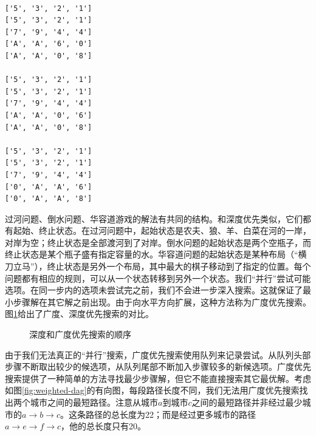 \documentclass[b5paper]{ctexart}
\begin{document}
\begin{verbatim}

['5', '3', '2', '1']
['5', '3', '2', '1']
['7', '9', '4', '4']
['A', 'A', '6', '0']
['A', 'A', '0', '8']

['5', '3', '2', '1']
['5', '3', '2', '1']
['7', '9', '4', '4']
['A', 'A', '0', '6']
['A', 'A', '0', '8']

['5', '3', '2', '1']
['5', '3', '2', '1']
['7', '9', '4', '4']
['0', 'A', 'A', '6']
['0', 'A', 'A', '8']

\end{verbatim}

 
过河问题、倒水问题、华容道游戏的解法有共同的结构。和深度优先类似，它们都有起始、终止状态。在过河问题中，起始状态是农夫、狼、羊、白菜在河的一岸，对岸为空；终止状态是全部渡河到了对岸。倒水问题的起始状态是两个空瓶子，而终止状态是某个瓶子盛有指定容量的水。华容道问题的起始状态是某种布局（“横刀立马”），终止状态是另外一个布局，其中最大的棋子移动到了指定的位置。每个问题都有相应的规则，可以从一个状态转移到另外一个状态。我们“并行”尝试可能选项。在同一步内的选项未尝试完之前，我们不会进一步深入搜索。这就保证了最小步骤解在其它解之前出现。由于向水平方向扩展，这种方法称为广度优先搜索。图\ref{fig:dfs-bfs-tree}给出了广度、深度优先搜索的对比。

\begin{figure}[htbp]
 \centering
 \caption{深度和广度优先搜索的顺序}
 \label{fig:dfs-bfs-tree}
\end{figure}

由于我们无法真正的“并行”搜索，广度优先搜索使用队列来记录尝试。从队列头部步骤不断取出较少的候选项，从队列尾部不断加入步骤较多的新候选项。广度优先搜索提供了一种简单的方法寻找最少步骤解，但它不能直接搜索其它最优解。考虑如图\ref{fig:weighted-dag}的有向图，每段路径长度不同，我们无法用广度优先搜索找出两个城市之间的最短路径。注意从城市$a$到城市$c$之间的最短路径并非经过最少城市的$a \to b \to c$。这条路径的总长度为22；而是经过更多城市的路径$a \to e \to f \to c$，他的总长度只有20。
\end{document}
